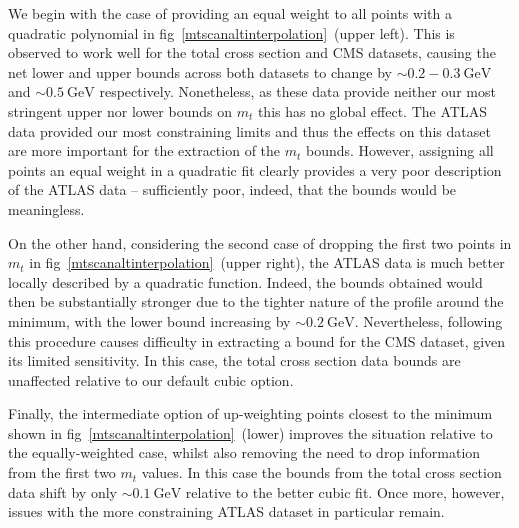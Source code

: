 \documentclass[sn-mathphys]{sn-jnl}%
\newcommand{\ytt}{y_{t\bar{t}}}
\newcommand{\mt}{m_t}
\newcommand{\gev}{\mathrm{GeV}}
\begin{document}
We begin with the case of providing an equal weight to all points with a quadratic polynomial in fig~\ref{mtscanaltinterpolation}~(upper left). This is observed to work well for the total cross section and CMS datasets, causing the net lower and upper bounds across both datasets to change by $\sim 0.2-0.3~\gev$ and $\sim 0.5~\gev$ respectively. Nonetheless, as these data provide neither our most stringent upper nor lower bounds on $\mt$ this has no global effect. The ATLAS data provided our most constraining limits and thus the effects on this dataset are more important for the extraction of the $\mt$ bounds. However, assigning all points an equal weight in a quadratic fit clearly provides a very poor description of the ATLAS data -- sufficiently poor, indeed, that the bounds would be meaningless.

On the other hand, considering the second case of dropping the first two points in $\mt$ in fig~\ref{mtscanaltinterpolation}~(upper right), the ATLAS data is much better locally described by a quadratic function. Indeed, the bounds obtained would then be substantially stronger due to the tighter nature of the profile around the minimum, with the lower bound increasing by $\sim 0.2~\gev$. Nevertheless, following this procedure causes difficulty in extracting a bound for the CMS dataset, given its limited sensitivity. In this case, the total cross section data bounds are unaffected relative to our default cubic option. 

Finally, the intermediate option of up-weighting points closest to the minimum shown in  fig~\ref{mtscanaltinterpolation}~(lower) improves the situation relative to the equally-weighted case, whilst also removing the need to drop information from the first two $\mt$ values. In this case the bounds from the %
total cross section data shift by only $\sim 0.1~\gev$  relative to the better cubic fit. Once more, however, issues with the more constraining ATLAS dataset in particular remain. 
\end{document}
